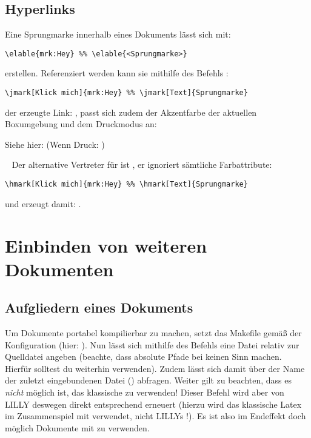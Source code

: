 \subsection{Hyperlinks}
Eine Sprungmarke innerhalb eines Dokuments lässt sich mit:
\begin{lstlisting}[language=lLatex]
\elable{mrk:Hey} %% \elable{<Sprungmarke>}
\end{lstlisting}
erstellen. Referenziert werden kann sie mithilfe des Befehls :
\begin{lstlisting}[language=lLatex]
\jmark[Klick mich]{mrk:Hey} %% \jmark[Text]{Sprungmarke}
\end{lstlisting}
der erzeugte Link: , passt sich zudem der Akzentfarbe der aktuellen Boxumgebung und dem Druckmodus an:\smallskip
\begin{zusammenfassung}[Testzusammenfassung]
Siehe hier:  (Wenn Druck: )
\end{zusammenfassung}~\smallskip\newline
Der alternative Vertreter für  ist , er ignoriert sämtliche Farbattribute:
\begin{lstlisting}[language=lLatex]
\hmark[Klick mich]{mrk:Hey} %% \hmark[Text]{Sprungmarke}
\end{lstlisting}
und erzeugt damit: .





\section{Einbinden von weiteren Dokumenten}
\subsection{Aufgliedern eines Dokuments}
Um Dokumente portabel kompilierbar zu machen, setzt das Makefile gemäß der Konfiguration  (hier: \say{\T{\LILLYxPATH}}). Nun lässt sich mithilfe des Befehls  eine Datei relativ zur Quelldatei angeben (beachte, dass absolute Pfade bei  keinen Sinn machen. Hierfür solltest du weiterhin  verwenden).\newline
Zudem lässt sich damit über  der Name der zuletzt eingebundenen Datei (\T{\LILLYxDOCUMENTxSUBNAME}) abfragen.\newline
{}Weiter gilt zu beachten, dass es \emph{nicht} möglich ist, das klassische  zu verwenden! Dieser Befehl wird aber von LILLY deswegen direkt entsprechend erneuert (hierzu wird das klassische Latex  im Zusammenspiel mit  verwendet, nicht LILLYs !). Es ist also im Endeffekt doch möglich Dokumente mit   zu verwenden.




